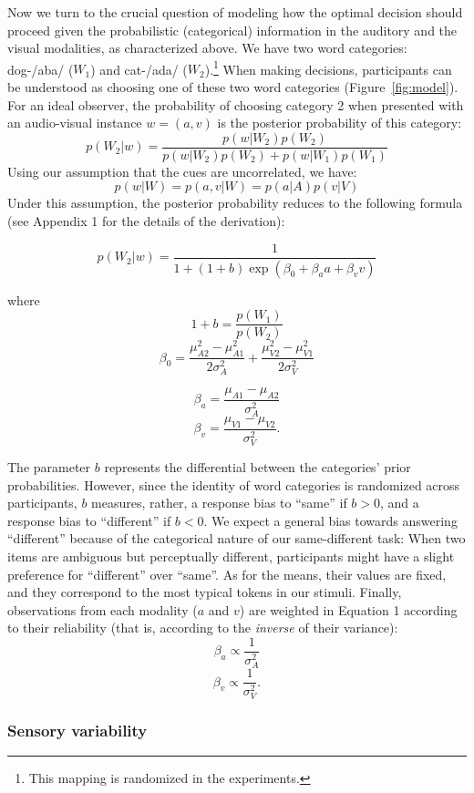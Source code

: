 \documentclass[english,,man,floatsintext]{apa6}
\let\rmarkdownfootnote\footnote%
\def\footnote{\protect\rmarkdownfootnote}
\theoremstyle{definition}
\theoremstyle{definition}
\theoremstyle{definition}
\theoremstyle{remark}
\begin{document}
Now we turn to the crucial question of modeling how the optimal decision
should proceed given the probabilistic (categorical) information in the
auditory and the visual modalities, as characterized above. We have two
word categories: dog-/aba/ (\(W_1\)) and cat-/ada/
(\(W_2\)).\footnote{This mapping is randomized in the experiments.} When
making decisions, participants can be understood as choosing one of
these two word categories (Figure~\ref{fig:model}). For an ideal
observer, the probability of choosing category 2 when presented with an
audio-visual instance \(w=(a,v)\) is the posterior probability of this
category: \[
p(W_2 | w)=\frac{p(w|W_2)p(W_2)}{p(w|W_2)p(W_2)+p(w|W_1)p(W_1)}
\] Using our assumption that the cues are uncorrelated, we have:
\[p(w | W) = p(a,v| W) = p(a| A)p(v| V)\] Under this assumption, the
posterior probability reduces to the following formula (see Appendix 1
for the details of the derivation):

\begin{equation}
 p(W_2 | w)=\frac{1}{1+(1+b)\exp(\beta_0+\beta_aa+\beta_vv)}
\end{equation}

where \[1+b=\frac{p(W_1)}{p(W_2)}\]
\[\beta_0=\frac{\mu^2_{A2}-\mu^2_{A1}}{2\sigma^2_{A}}+\frac{\mu^2_{V2}-\mu^2_{V1}}{2\sigma^2_{V}}\]

\[\beta_a=\frac{\mu_{A1}-\mu_{A2}}{\sigma^2_{A}}\]
\[\beta_v=\frac{\mu_{V1}-\mu_{V2}}{\sigma^2_{V}}.\]

The parameter \(b\) represents the differential between the categories'
prior probabilities. However, since the identity of word categories is
randomized across participants, \(b\) measures, rather, a response bias
to \enquote{same} if \(b > 0\), and a response bias to
\enquote{different} if \(b < 0\). We expect a general bias towards
answering \enquote{different} because of the categorical nature of our
same-different task: When two items are ambiguous but perceptually
different, participants might have a slight preference for
\enquote{different} over \enquote{same}. As for the means, their values
are fixed, and they correspond to the most typical tokens in our
stimuli. Finally, observations from each modality (\(a\) and \(v\)) are
weighted in Equation 1 according to their reliability (that is,
according to the \emph{inverse} of their variance):
\[\beta_a \propto \frac{1}{\sigma^2_{A}}\]
\[\beta_v \propto \frac{1}{\sigma^2_{V}}.\]

\subsubsection{Sensory variability}\label{sensory-variability}
\end{document}
